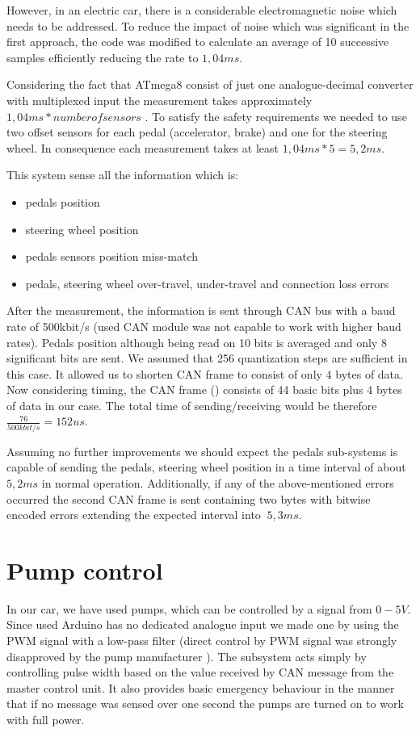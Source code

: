 However, in an electric car, there is a considerable electromagnetic noise which needs to be addressed. To reduce the impact of noise which was significant in the first approach, the code was modified to calculate an average of 10 successive samples efficiently reducing the rate to $1,04ms$.

Considering the fact that ATmega8 consist of just one analogue-decimal converter with multiplexed input the measurement takes approximately $1,04ms * number of sensors$ \cite{Atmega8}.
To satisfy the safety requirements we needed to use two offset sensors for each pedal (accelerator, brake) and one for the steering wheel. In consequence each measurement takes at least $1,04ms * 5 = 5,2ms$.

This system sense all the information which is:
\begin{itemize}
    \item pedals position
    \item steering wheel position
    \item pedals sensors position miss-match
    \item pedals, steering wheel over-travel, under-travel and connection loss errors
\end{itemize}

After the measurement, the information is sent through CAN bus with a baud rate of 500kbit/s (used CAN module was not capable to work with higher baud rates). Pedals position although being read on 10 bits is averaged and only 8 significant bits are sent. We assumed that 256 quantization steps are sufficient in this case. It allowed us to shorten CAN frame to consist of only 4 bytes of data.
Now considering timing, the CAN frame () consists of 44 basic bits plus 4 bytes of data in our case. The total time of sending/receiving would be therefore $\frac{76}{500kbit/s} = 152us$.

Assuming no further improvements we should expect the pedals sub-systems is capable of sending the pedals, steering wheel position in a time interval of about $5,2ms$\label{pedal_ideal_time} in normal operation.
Additionally, if any of the above-mentioned errors occurred the second CAN frame is sent containing two bytes with bitwise encoded errors extending the expected interval into $~5,3ms$.

\section{Pump control}
In our car, we have used  pumps, which can be controlled by a signal from $0-5V$. Since used Arduino has no dedicated analogue input we made one by using the PWM signal with a low-pass filter (direct control by PWM signal was strongly disapproved by the pump manufacturer ).
The subsystem acts simply by controlling pulse width based on the value received by CAN message from the master control unit. It also provides basic emergency behaviour in the manner that if no message was sensed over one second the pumps are turned on to work with full power.






